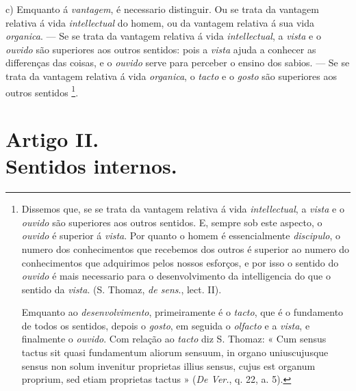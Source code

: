 




c) Emquanto á \emph{vantagem}, é necessario distinguir. Ou se trata da vantagem relativa á vida \emph{intellectual} do homem, ou da vantagem relativa á sua vida \emph{organica}. --- Se se trata da vantagem relativa á vida \emph{intellectual}, a \emph{vista} e o \emph{ouvido} são superiores aos outros sentidos: pois a \emph{vista} ajuda a conhecer as differenças das coisas, e o \emph{ouvido} serve para perceber o    ensino dos sabios. --- Se se trata da vantagem relativa á vida \emph{organica}, o \emph{tacto} e o \emph{gosto} são superiores aos outros sentidos \footnote{Dissemos que, se se trata da vantagem relativa á vida \emph{intellectual}, a \emph{vista} e o \emph{ouvido} são superiores aos outros sentidos. E, sempre sob este aspecto, o \emph{ouvido} é superior á \emph{vista}. Por quanto o homem é essencialmente \emph{discipulo}, o numero dos conhecimentos que recebemos dos outros é superior ao numero do conhecimentos que adquirimos pelos nossos esforços, e por isso o sentido do \emph{ouvido} é mais necessario para o desenvolvimento da intelligencia do que o sentido da \emph{vista}. (S. Thomaz, \emph{de sens}., lect. II).\par Emquanto ao \emph{desenvolvimento}, primeiramente é o \emph{tacto}, que é o fundamento de todos os sentidos, depois o \emph{gosto}, em seguida o \emph{olfacto} e a \emph{vista}, e finalmente o \emph{ouvido}. Com relação ao \emph{tacto} diz S. Thomaz: « Cum sensus tactus sit quasi fundamentum aliorum sensuum, in organo uniuscujusque sensus non solum invenitur proprietas illius sensus, cujus est organum proprium, sed etiam proprietas tactus » (\emph{De Ver.}, q. 22, a. 5).}.


\section*{Artigo II.\\ Sentidos internos.}


